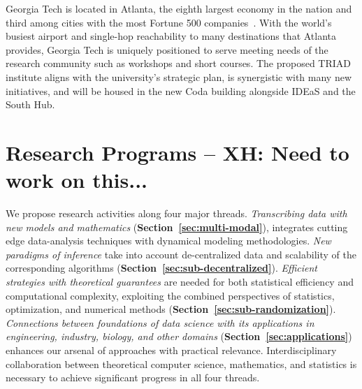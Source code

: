 \documentclass[12pt]{article}
\begin{document}
Georgia Tech is located in Atlanta, the eighth largest economy in the nation and third among
cities with the most Fortune 500 companies~\cite{geolounge2016}. With the world's busiest airport
and single-hop reachability to many destinations that Atlanta provides, Georgia Tech is
uniquely positioned to serve meeting needs of the research community such as workshops and short courses. The proposed TRIAD institute aligns with the university's strategic plan, is synergistic
with many new initiatives, and will be housed in the new Coda building alongside IDEaS and the South Hub.
\vspace*{-1em}

\section{Research Programs -- XH: Need to work on this...}
\label{sec:proposed}


We propose research activities along four major threads.
{\it Transcribing data with new models and mathematics} ({\bf Section~\ref{sec:multi-modal}}), integrates cutting edge data-analysis techniques with dynamical modeling methodologies.
{\it New paradigms of inference} take into account de-centralized data and scalability of the corresponding algorithms ({\bf Section~\ref{sec:sub-decentralized}}).
{\it Efficient strategies with theoretical guarantees} are needed for both statistical efficiency and computational complexity, exploiting the combined perspectives of statistics, optimization, and numerical methods ({\bf Section~\ref{sec:sub-randomization}}).
{\it Connections between foundations of data science with its applications in engineering, industry, biology, and other domains} ({\bf Section~\ref{sec:applications}}) enhances our arsenal of approaches with practical relevance.
Interdisciplinary collaboration between theoretical computer science, mathematics, and statistics is necessary to achieve significant progress in all four threads.

\end{document}

